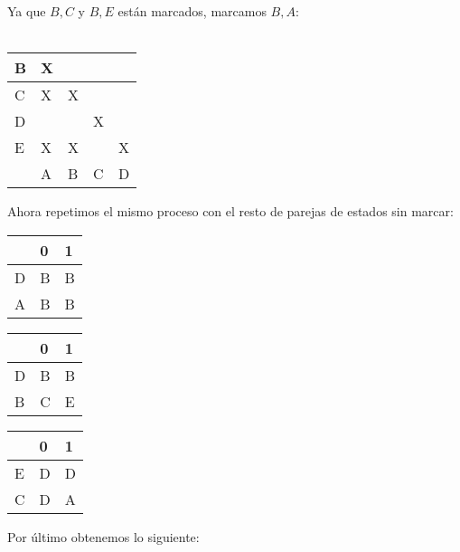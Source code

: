 \documentclass{article}
\begin{document}
Ya que $B, C$ y $B, E$ están marcados, marcamos $B, A$:\\\\

\begin{table}[h]
\centering
\begin{tabular}{|lllll|}
\hline
B &\multicolumn{1}{|l|}{X} &  &  &  \\
 \hline
C &\multicolumn{1}{|l|}{X} & \multicolumn{1}{l|}{X} &  &  \\
 \hline
D &\multicolumn{1}{|l|}{}& \multicolumn{1}{l|}{} & \multicolumn{1}{|l|}{X} &  \\
 \hline
E &\multicolumn{1}{|l|}{X} & \multicolumn{1}{l|}{X} &\multicolumn{1}{|l|}{}  & \multicolumn{1}{l|}{X}\\
\hline
 & \multicolumn{1}{|l|}{A} & \multicolumn{1}{|l|}{B} & \multicolumn{1}{|l|}{C} & \multicolumn{1}{|l|}{D} \\
\hline
\end{tabular}
\end{table}

Ahora repetimos el mismo proceso con el resto de parejas de estados sin marcar:

\begin{table}[h]
\centering
\begin{tabular}{|l|l|l|}
\hline
& 0 & 1 \\
\hline
D & B & B \\
\hline
A & B & B \\
 \hline
\end{tabular}
\begin{tabular}{|l|l|l|}
\hline
& 0 & 1 \\
\hline
D & B & B \\
\hline
B & C & E \\
 \hline
\end{tabular}
\begin{tabular}{|l|l|l|}
\hline
& 0 & 1 \\
\hline
E & D & D \\
\hline
C & D & A \\
 \hline
\end{tabular}
\end{table}
\newpage
Por último obtenemos lo siguiente:
\end{document}
